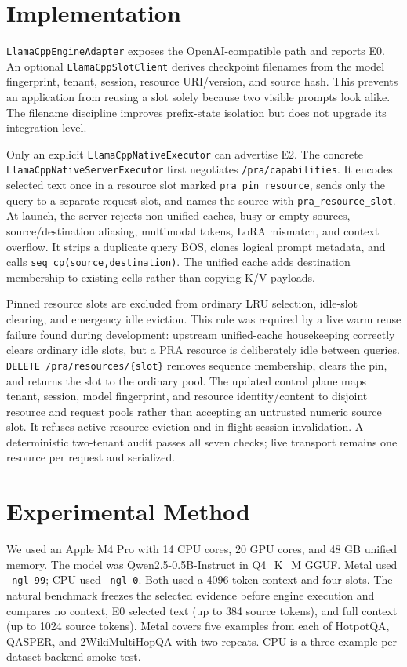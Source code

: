\documentclass[10pt]{article}
\begin{document}
\section{Implementation}
\texttt{LlamaCppEngineAdapter} exposes the OpenAI-compatible path and reports E0.
An optional \texttt{LlamaCppSlotClient} derives checkpoint filenames from the
model fingerprint, tenant, session, resource URI/version, and source hash. This
prevents an application from reusing a slot solely because two visible prompts
look alike. The filename discipline improves prefix-state isolation but does
not upgrade its integration level.

Only an explicit \texttt{LlamaCppNativeExecutor} can advertise E2. The concrete
\texttt{LlamaCppNativeServerExecutor} first negotiates
\texttt{/pra/capabilities}. It encodes selected text once in a resource slot
marked \texttt{pra\_pin\_resource}, sends only the query to a separate request
slot, and names the source with \texttt{pra\_resource\_slot}. At launch, the
server rejects non-unified caches, busy or empty sources, source/destination
aliasing, multimodal tokens, LoRA mismatch, and context overflow. It strips a
duplicate query BOS, clones logical prompt metadata, and calls
\texttt{seq\_cp(source,destination)}. The unified cache adds destination
membership to existing cells rather than copying K/V payloads.

Pinned resource slots are excluded from ordinary LRU selection, idle-slot
clearing, and emergency idle eviction. This rule was required by a live warm
reuse failure found during development: upstream unified-cache housekeeping
correctly clears ordinary idle slots, but a PRA resource is deliberately idle
between queries. \texttt{DELETE /pra/resources/\{slot\}} removes sequence
membership, clears the pin, and returns the slot to the ordinary pool. The
updated control plane maps tenant, session, model fingerprint, and resource
identity/content to disjoint resource and request pools rather than accepting an
untrusted numeric source slot. It refuses active-resource eviction and in-flight
session invalidation. A deterministic two-tenant audit passes all seven checks;
live transport remains one resource per request and serialized.

\section{Experimental Method}
We used an Apple M4 Pro with 14 CPU cores, 20 GPU cores, and 48 GB unified
memory. The model was Qwen2.5-0.5B-Instruct in Q4\_K\_M GGUF. Metal used
\texttt{-ngl 99}; CPU used \texttt{-ngl 0}. Both used a 4096-token context and
four slots. The natural benchmark freezes the selected evidence before engine
execution and compares no context, E0 selected text (up to 384 source tokens),
and full context (up to 1024 source tokens). Metal covers five examples from
each of HotpotQA, QASPER, and 2WikiMultiHopQA with two repeats. CPU is a
three-example-per-dataset backend smoke test.
\end{document}
